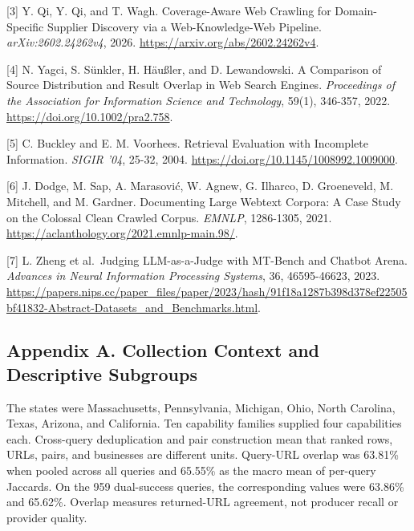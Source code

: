 \documentclass[10pt]{article}
\begin{document}
{[}3{]} Y. Qi, Y. Qi, and T. Wagh. Coverage-Aware Web Crawling for Domain-Specific Supplier Discovery via a Web-Knowledge-Web Pipeline. \emph{arXiv:2602.24262v4}, 2026. \url{https://arxiv.org/abs/2602.24262v4}.

{[}4{]} N. Yagci, S. Sünkler, H. Häußler, and D. Lewandowski. A Comparison of Source Distribution and Result Overlap in Web Search Engines. \emph{Proceedings of the Association for Information Science and Technology}, 59(1), 346-357, 2022. \url{https://doi.org/10.1002/pra2.758}.

{[}5{]} C. Buckley and E. M. Voorhees. Retrieval Evaluation with Incomplete Information. \emph{SIGIR '04}, 25-32, 2004. \url{https://doi.org/10.1145/1008992.1009000}.

{[}6{]} J. Dodge, M. Sap, A. Marasović, W. Agnew, G. Ilharco, D. Groeneveld, M. Mitchell, and M. Gardner. Documenting Large Webtext Corpora: A Case Study on the Colossal Clean Crawled Corpus. \emph{EMNLP}, 1286-1305, 2021. \url{https://aclanthology.org/2021.emnlp-main.98/}.

{[}7{]} L. Zheng et al.~Judging LLM-as-a-Judge with MT-Bench and Chatbot Arena. \emph{Advances in Neural Information Processing Systems}, 36, 46595-46623, 2023. \url{https://papers.nips.cc/paper_files/paper/2023/hash/91f18a1287b398d378ef22505bf41832-Abstract-Datasets_and_Benchmarks.html}.

\endgroup
\clearpage

\hypertarget{appendix-a.-collection-context-and-descriptive-subgroups}{%
\subsection{Appendix A. Collection Context and Descriptive Subgroups}\label{appendix-a.-collection-context-and-descriptive-subgroups}}

The states were Massachusetts, Pennsylvania, Michigan, Ohio, North Carolina, Texas, Arizona, and California. Ten capability families supplied four capabilities each. Cross-query deduplication and pair construction mean that ranked rows, URLs, pairs, and businesses are different units. Query-URL overlap was 63.81\% when pooled across all queries and 65.55\% as the macro mean of per-query Jaccards. On the 959 dual-success queries, the corresponding values were 63.86\% and 65.62\%. Overlap measures returned-URL agreement, not producer recall or provider quality.
\end{document}
